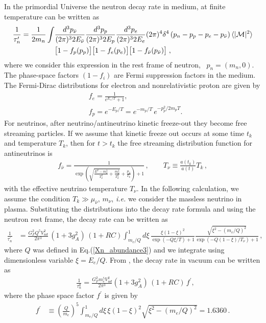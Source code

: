 In the primordial Universe the neutron decay rate in medium, at finite temperature can be written as~\cite{Kuznetsova:2010pi}
\begin{align}
\frac{1}{\tau^\prime_n}=\frac{1}{2m_n}\int&\frac{d^3p_{\bar{\nu}}}{(2\pi)^32E_{\bar{\nu}}}\frac{d^3p_p}{(2\pi)^32E_p}\frac{d^3p_e}{(2\pi)^32E_e}(2\pi)^4\delta^4\left(p_n-p_p-p_e-p_{\bar{\nu}}\right)\langle|\mathcal{M}|^2\rangle\notag\\
&\big[1-f_p(p_p)\big]\big[1-f_e(p_e)\big]\big[1-f_{\bar{\nu}}(p_{\bar{\nu}})\big]\;,
\end{align}
where we consider this expression in the rest frame of neutron, \ie\ $p_n=(m_n,0)$. The phase-space factors $(1-f_i)$ are Fermi suppression factors in the medium. The Fermi-Dirac distributions for electron and nonrelativistic proton are given by
\begin{align}
&f_e=\frac{1}{e^{E_e/T}+1},\\
&f_p=e^{-E_p/T}=e^{-m_p/T}\,e^{-p_p^2/2m_pT}.
\end{align}
For neutrinos, after neutrino/antineutrino kinetic freeze-out they become free streaming particles. If we assume that kinetic freeze out occurs at some time $t_k$ and temperature $T_k$, then for $t>t_k$ the free streaming distribution function  for antineutrinos is
\begin{align}
f_{\bar{\nu}}=\frac{1}{\exp{\left(\sqrt{\frac{E^2-m_\nu^2}{T_\nu^2}+\frac{m^2_\nu}{T^2_k}}+\frac{\mu_{\bar{\nu}}}{T_k}\right)+1}}\,,\qquad
T_\nu\equiv\frac{a(t_k)}{a(t)}T_k\,,
\end{align}
with the effective neutrino temperature $T_\nu$. In the following calculation, we assume the condition $T_k\gg\mu_{\bar{\nu}},\,m_\nu$, {\it i.e.\/} we consider the massless neutrino in plasma. Substituting the distributions into the decay rate formula and using the neutron rest frame, the decay rate can be written as 
\begin{align}
\label{Decay:Rate_01}
\frac{1}{\tau_n^\prime}&=\frac{G^2_FQ^5V^2_{ud}}{2\pi^3}\,(1+3g^2_A)\,(1+RC)
\int^1_{m_e/Q}d\xi\,\frac{\xi(1-\xi)^2}{\exp\left(-Q\xi/{T}\right)+1}\frac{\sqrt{\xi^2-(m_e/Q)^2}}{\exp\left(-Q(1-\xi)/T_\nu\right)+1}\,,
\end{align} 
where $Q$ was defined in Eq.\;(\ref{Xn_abundance3}) and we integrate using dimensionless variable $\xi=E_e/Q$. From , the decay rate in vacuum can be written as
\begin{align}
&\frac{1}{\tau_n^0}=\frac{G^2_Fm_e^5V^2_{ud}}{2\pi^3}(1+3g^2_A)\,(1+RC)\,f^\prime,
\end{align}
where the phase space factor $f^\prime$ is given by
\begin{align}
f^\prime&\equiv\left(\frac{Q}{m_e}\right)^5\int^1_{m_e/Q}d\xi\,{\xi(1-\xi)^2}\sqrt{\xi^2-(m_e/Q)^2}=1.6360\,.
\end{align}

